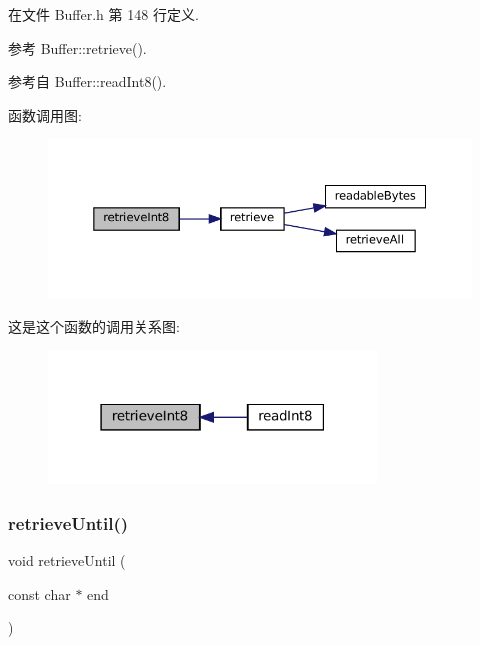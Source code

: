 在文件 Buffer.\+h 第 148 行定义.



参考 Buffer\+::retrieve().



参考自 Buffer\+::read\+Int8().

函数调用图\+:
\nopagebreak
\begin{figure}[H]
\begin{center}
\leavevmode
\includegraphics[width=350pt]{classmuduo_1_1net_1_1Buffer_a4605c83f07f06cc12d0ab3a2d54be43e_cgraph}
\end{center}
\end{figure}
这是这个函数的调用关系图\+:
\nopagebreak
\begin{figure}[H]
\begin{center}
\leavevmode
\includegraphics[width=247pt]{classmuduo_1_1net_1_1Buffer_a4605c83f07f06cc12d0ab3a2d54be43e_icgraph}
\end{center}
\end{figure}
\mbox{\label{classmuduo_1_1net_1_1Buffer_abffa19bdb1fbf4ac36fe0f2375bee1e5}} 
\subsubsection{\texorpdfstring{retrieve\+Until()}{retrieveUntil()}}
{\footnotesize\ttfamily void retrieve\+Until (\begin{DoxyParamCaption}\item[{const char $\ast$}]{end }\end{DoxyParamCaption})\hspace{0.3cm}{\ttfamily [inline]}}



